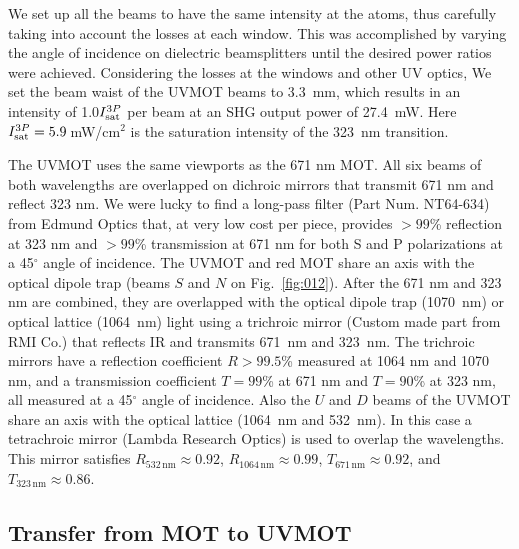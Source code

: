 We set up all the beams to have the same intensity at the atoms, thus carefully
taking into account the losses at each window.  This was accomplished by
varying the angle of incidence on dielectric beamsplitters until the desired
power ratios were achieved.  
Considering the losses at the windows and other UV optics, We set the beam waist
of the UVMOT beams to 3.3~mm, which results in an intensity of 1.0$ I_{\mathrm{sat}} ^{3P}$
per beam at an SHG output power of 27.4~mW.  Here $ I_{\mathrm{sat}} ^{3P}=5.9$\,mW/cm$^{2}$
is the saturation intensity of the 323~nm transition.  

The UVMOT uses the same viewports as the 671 nm MOT. All six beams of both
wavelengths are overlapped on dichroic mirrors that transmit 671 nm and reflect
323 nm.  We were lucky to find a long-pass filter (Part Num. NT64-634) from
Edmund Optics that, at very low cost per piece, provides $>99$\% reflection at
323 nm and $>99$\% transmission at 671 nm for both S and P polarizations at a
45$^{\circ}$ angle of incidence.  The UVMOT and red MOT share an axis with the
optical dipole trap (beams $S$ and $N$ on Fig.~\ref{fig:012}).   After the 671
nm and 323 nm are combined, they are overlapped with the optical dipole trap
(1070~nm) or optical lattice (1064~nm) light using a trichroic mirror (Custom
made part from RMI Co.)  that reflects IR and transmits 671~nm and 323~nm.  The
trichroic mirrors have a reflection coefficient  $R>99.5$\% measured at 1064 nm
and 1070 nm, and a transmission coefficient $T=99$\% at 671 nm and $T=90$\% at
323 nm, all measured at a 45$^{\circ}$ angle of incidence.  Also the $U$ and
$D$ beams of the UVMOT share an axis with the optical lattice (1064~nm and
532~nm).  In this case a tetrachroic mirror (Lambda Research Optics) is used to
overlap the wavelengths.  This mirror satisfies $R_{532\,\mathrm{nm}} \approx
0.92$, $R_{1064\,\mathrm{nm}}\approx 0.99$, $T_{671\,\mathrm{nm}}\approx0.92$,
and $T_{323\,\mathrm{nm}}\approx0.86$. 


\subsection{Transfer from MOT to UVMOT}
\label{subsec:mot-uvmot}


